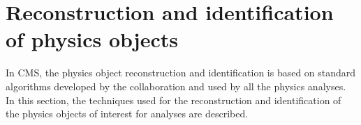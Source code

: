 \chapter{Reconstruction and identification of physics objects}\label{chap3}
\thispagestyle{empty}

In CMS, the physics object reconstruction and identification is based on standard algorithms developed by the collaboration and used by all the physics analyses. In this section, the techniques used for the reconstruction and identification of the physics objects of interest for \hwwllnn analyses are described.






